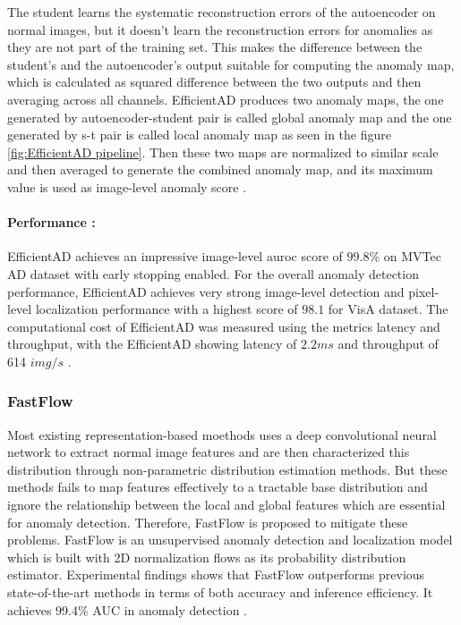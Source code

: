 The student learns the systematic reconstruction errors of the autoencoder on normal images, but it doesn't learn the reconstruction errors for anomalies as they are not part of the training set. This makes the difference between the student's and the autoencoder's output suitable for computing the anomaly map, which is calculated as squared difference between the two outputs and then averaging across all channels. EfficientAD produces two anomaly maps, the one generated by autoencoder-student pair is called global anomaly map and the one generated by \gls{s-t} pair is called local anomaly map as seen in the figure \ref{fig:EfficientAD pipeline}. Then these two maps are normalized to similar scale and then averaged to generate the combined anomaly map, and its maximum value is used as image-level anomaly score \cite{batzner2024efficientadaccuratevisualanomaly}.

\paragraph*{Performance :}

EfficientAD achieves an impressive image-level \gls{auroc} score of $99.8\%$ on MVTec AD dataset\cite{8954181} with early stopping enabled. For the overall anomaly detection performance, EfficientAD achieves very strong image-level detection and pixel-level localization performance with a highest score of $98.1$ for VisA\cite{zou2022spotthedifferenceselfsupervisedpretraininganomaly} dataset. The computational cost of EfficientAD was measured using the metrics latency and throughput, with the EfficientAD showing latency of $2.2ms$ and throughput of 614 $img/s$ \cite{batzner2024efficientadaccuratevisualanomaly}.

\subsubsection{FastFlow}
\label{subsec:fastflow}

Most existing representation-based moethods uses a deep convolutional neural network to extract normal image features and are then characterized this distribution through non-parametric distribution estimation methods. But these methods fails to map features effectively to a tractable base distribution and ignore the relationship between the local and global features which are essential for anomaly detection. Therefore, FastFlow is proposed to mitigate these problems. FastFlow is an unsupervised anomaly detection and localization model which is built with 2D normalization flows as its probability distribution estimator. Experimental findings shows that FastFlow outperforms previous state-of-the-art methods in terms of both accuracy and inference efficiency. It achieves 99.4\% AUC in anomaly detection \cite{yu2021fastflowunsupervisedanomalydetection}.

